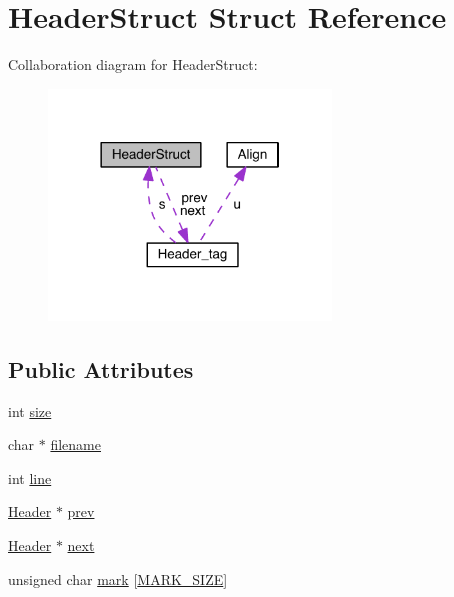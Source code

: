 \hypertarget{struct_header_struct}{}\section{Header\+Struct Struct Reference}
\label{struct_header_struct}


Collaboration diagram for Header\+Struct\+:\nopagebreak
\begin{figure}[H]
\begin{center}
\leavevmode
\includegraphics[width=213pt]{struct_header_struct__coll__graph}
\end{center}
\end{figure}
\subsection*{Public Attributes}
\begin{DoxyCompactItemize}
\item 
int \hyperlink{struct_header_struct_ad6b63ca7e387b292da71cf12e41b56ca}{size}
\item 
char $\ast$ \hyperlink{struct_header_struct_ac66081945a967351e1c465cf9fc1ad0e}{filename}
\item 
int \hyperlink{struct_header_struct_a598de0f5ec396866b1d534806ac93fb5}{line}
\item 
\hyperlink{memory_8h_a387a413b7c06fb892e5cc4a59fe7ed17}{Header} $\ast$ \hyperlink{struct_header_struct_a3071c07de335b54aaa6151adb871f8bf}{prev}
\item 
\hyperlink{memory_8h_a387a413b7c06fb892e5cc4a59fe7ed17}{Header} $\ast$ \hyperlink{struct_header_struct_adb09b99f377a7c151915ddd4b63eb2ae}{next}
\item 
unsigned char \hyperlink{struct_header_struct_aa7ff45e1bfc66ff72d9ffc41e4021447}{mark} \mbox{[}\hyperlink{memory_8c_a017f486cae1059db631df5f5c360d9f5}{M\+A\+R\+K\+\_\+\+S\+I\+Z\+E}\mbox{]}
\end{DoxyCompactItemize}


